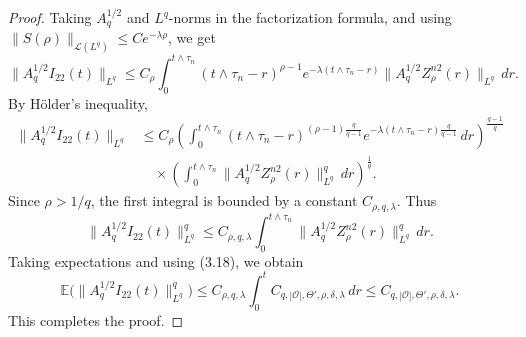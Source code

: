 \documentclass[10pt]{article}
\numberwithin{figure}{section}
\numberwithin{equation}{section}
\newcommand{\0}{{\theta}}
\begin{document}
\begin{proof}
Taking $A_q^{1/2}$ and $L^q$-norms in the factorization formula, and using $\|S(\rho)\|_{\mathcal L(L^q)}\le C e^{-\lambda\rho}$, we get
$$
\|A_q^{1/2}I_{22}(t)\|_{L^q}
\le C_\rho
\int_0^{t\wedge\tau_n}(t\wedge\tau_n-r)^{\rho-1}
e^{-\lambda(t\wedge\tau_n-r)}
\|A_q^{1/2}Z_\rho^{n2}(r)\|_{L^q}\,dr.
$$
By H\"older's inequality,
\begin{align*}
\|A_q^{1/2}I_{22}(t)\|_{L^q}
&\le C_\rho
\left( \int_0^{t\wedge\tau_n} (t\wedge\tau_n-r)^{(\rho-1)\frac{q}{q-1}} e^{-\lambda(t\wedge\tau_n-r)\frac{q}{q-1}} \, dr \right)^{\frac{q-1}{q}} \\
&\quad\times
\left( \int_0^{t\wedge\tau_n} \|A_q^{1/2}Z_\rho^{n2}(r)\|_{L^q}^q \, dr \right)^{\frac{1}{q}}.
\end{align*}
Since $\rho>1/q$, the first integral is bounded by a constant $C_{\rho,q,\lambda}$. Thus
$$
\|A_q^{1/2}I_{22}(t)\|_{L^q}^q
\le C_{\rho,q,\lambda}
\int_0^{t\wedge\tau_n}\|A_q^{1/2}Z_\rho^{n2}(r)\|_{L^q}^q\,dr.
$$
Taking expectations and using (3.18), we obtain
$$
\mathbb{E}\big(\|A_q^{1/2}I_{22}(t)\|_{L^q}^q\big)
\le C_{\rho,q,\lambda}\int_0^t C_{q,|\mathcal O|,\Theta',\rho,\delta,\lambda}\,dr
\le C_{q,|\mathcal O|,\Theta',\rho,\delta,\lambda}.
$$
This completes the proof.
\end{proof}
\end{document}
